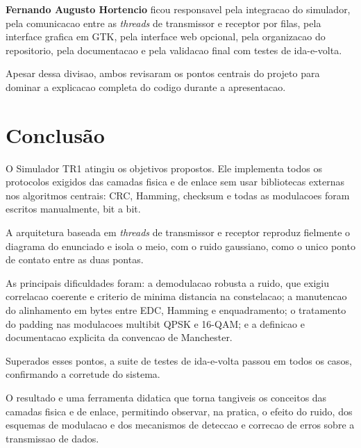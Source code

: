 \documentclass[12pt,a4paper]{article}
\begin{document}
\textbf{Fernando Augusto Hortencio} ficou responsavel pela integracao do simulador, pela comunicacao entre as \textit{threads} de transmissor e receptor por filas, pela interface grafica em GTK, pela interface web opcional, pela organizacao do repositorio, pela documentacao e pela validacao final com testes de ida-e-volta.

Apesar dessa divisao, ambos revisaram os pontos centrais do projeto para dominar a explicacao completa do codigo durante a apresentacao.

\section{Conclusão}

O Simulador TR1 atingiu os objetivos propostos. Ele implementa todos os protocolos exigidos das camadas fisica e de enlace sem usar bibliotecas externas nos algoritmos centrais: CRC, Hamming, checksum e todas as modulacoes foram escritos manualmente, bit a bit.

A arquitetura baseada em \textit{threads} de transmissor e receptor reproduz fielmente o diagrama do enunciado e isola o meio, com o ruido gaussiano, como o unico ponto de contato entre as duas pontas.

As principais dificuldades foram: a demodulacao robusta a ruido, que exigiu correlacao coerente e criterio de minima distancia na constelacao; a manutencao do alinhamento em bytes entre EDC, Hamming e enquadramento; o tratamento do padding nas modulacoes multibit QPSK e 16-QAM; e a definicao e documentacao explicita da convencao de Manchester.

Superados esses pontos, a suite de testes de ida-e-volta passou em todos os casos, confirmando a corretude do sistema.

O resultado e uma ferramenta didatica que torna tangiveis os conceitos das camadas fisica e de enlace, permitindo observar, na pratica, o efeito do ruido, dos esquemas de modulacao e dos mecanismos de deteccao e correcao de erros sobre a transmissao de dados.
\end{document}

